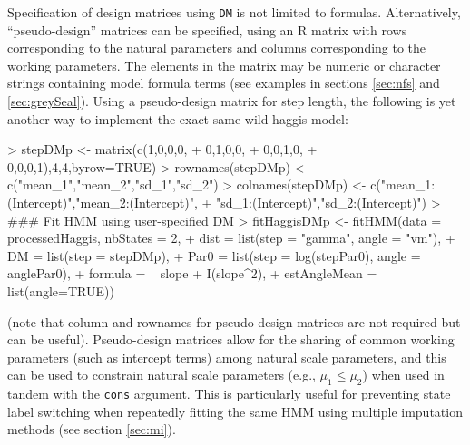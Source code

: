 \documentclass[12pt]{article}
\begin{document}
Specification of design matrices using \verb|DM| is not limited to formulas. Alternatively, ``pseudo-design'' matrices can be specified, using an R matrix with rows corresponding to the natural parameters and columns corresponding to the working parameters. The elements in the matrix may be numeric or character strings containing model formula terms (see examples in sections \ref{sec:nfs} and \ref{sec:greySeal}). Using a pseudo-design matrix for step length, the following is yet another way to implement the exact same wild haggis model:
\begin{Schunk}
\begin{Sinput}
> stepDMp <- matrix(c(1,0,0,0,
+                    0,1,0,0,
+                    0,0,1,0,
+                    0,0,0,1),4,4,byrow=TRUE)
> rownames(stepDMp) <- c("mean_1","mean_2","sd_1","sd_2")
> colnames(stepDMp) <- c("mean_1:(Intercept)","mean_2:(Intercept)",
+                       "sd_1:(Intercept)","sd_2:(Intercept)")
> ### Fit HMM	using user-specified DM
> fitHaggisDMp <- fitHMM(data = processedHaggis, nbStates = 2,
+                        dist = list(step = "gamma", angle = "vm"),
+                        DM = list(step = stepDMp),
+                        Par0 = list(step = log(stepPar0), angle = anglePar0),
+                        formula = ~ slope + I(slope^2),
+                        estAngleMean = list(angle=TRUE))
\end{Sinput}
\end{Schunk}
(note that column and rownames for pseudo-design matrices are not required but can be useful). Pseudo-design matrices allow for the sharing of common working parameters (such as intercept terms) among natural scale parameters, and this can be used to constrain natural scale parameters (e.g., $\mu_1 \le \mu_2$) when used in tandem with the \verb|cons| argument.  This is particularly useful for preventing state label switching when repeatedly fitting the same HMM using multiple imputation methods (see section \ref{sec:mi}).
\end{document}
